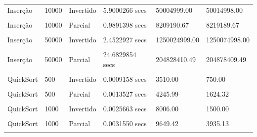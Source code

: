 \documentclass[
]{article}
\begin{document}
\begin{longtable}[l]{llllll}
Inserção & 10000 & Invertido & 5.9000266 secs & 50004999.00 & 50014998.00\\
\cellcolor{gray!15}{Inserção} & \cellcolor{gray!15}{10000} & \cellcolor{gray!15}{Ordenado} & \cellcolor{gray!15}{0.0012832 secs} & \cellcolor{gray!15}{9999.00} & \cellcolor{gray!15}{19998.00}\\
Inserção & 10000 & Parcial & 0.9891398 secs & 8209190.67 & 8219189.67\\
\cellcolor{gray!15}{Inserção} & \cellcolor{gray!15}{50000} & \cellcolor{gray!15}{Aleatório} & \cellcolor{gray!15}{1.2550940 secs} & \cellcolor{gray!15}{625139777.91} & \cellcolor{gray!15}{625189776.91}\\
Inserção & 50000 & Invertido & 2.4522927 secs & 1250024999.00 & 1250074998.00\\
\cellcolor{gray!15}{Inserção} & \cellcolor{gray!15}{50000} & \cellcolor{gray!15}{Ordenado} & \cellcolor{gray!15}{0.0067918 secs} & \cellcolor{gray!15}{49999.00} & \cellcolor{gray!15}{99998.00}\\
Inserção & 50000 & Parcial & 24.6829854 secs & 204828410.49 & 204878409.49\\
\cellcolor{gray!15}{QuickSort} & \cellcolor{gray!15}{500} & \cellcolor{gray!15}{Aleatório} & \cellcolor{gray!15}{0.0016056 secs} & \cellcolor{gray!15}{4693.96} & \cellcolor{gray!15}{3134.49}\\
QuickSort & 500 & Invertido & 0.0009158 secs & 3510.00 & 750.00\\
\cellcolor{gray!15}{QuickSort} & \cellcolor{gray!15}{500} & \cellcolor{gray!15}{Ordenado} & \cellcolor{gray!15}{0.0009406 secs} & \cellcolor{gray!15}{3753.00} & \cellcolor{gray!15}{0.00}\\
QuickSort & 500 & Parcial & 0.0013527 secs & 4245.99 & 1624.32\\
\cellcolor{gray!15}{QuickSort} & \cellcolor{gray!15}{1000} & \cellcolor{gray!15}{Aleatório} & \cellcolor{gray!15}{0.0042355 secs} & \cellcolor{gray!15}{10498.21} & \cellcolor{gray!15}{6969.87}\\
QuickSort & 1000 & Invertido & 0.0025663 secs & 8006.00 & 1500.00\\
\cellcolor{gray!15}{QuickSort} & \cellcolor{gray!15}{1000} & \cellcolor{gray!15}{Ordenado} & \cellcolor{gray!15}{0.0028448 secs} & \cellcolor{gray!15}{8498.00} & \cellcolor{gray!15}{0.00}\\
QuickSort & 1000 & Parcial & 0.0031550 secs & 9649.42 & 3935.13\\
\cellcolor{gray!15}{QuickSort} & \cellcolor{gray!15}{5000} & \cellcolor{gray!15}{Aleatório} & \cellcolor{gray!15}{0.0350165 secs} & \cellcolor{gray!15}{65796.11} & \cellcolor{gray!15}{42854.85}\\

\end{longtable}
\end{document}
